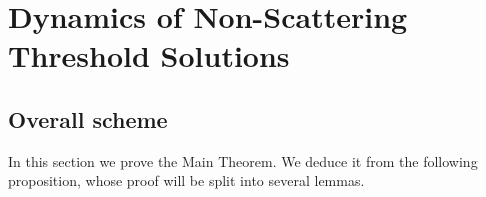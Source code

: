 \documentclass[10pt,reqno]{amsart}
\newcommand{\vd}{\mathrm{d}}
\newcommand{\udr}{\,r\vd r}
\newcommand{\A}{\mathcal{A}}
\newcommand{\la}{\lambda}
\newcommand{\La}{\Lambda}
\newcommand{\ang}[1]{\left\langle{#1}\right\rangle}
\newcommand{\abs}[1]{\left\lvert{#1}\right\rvert}
\numberwithin{equation}{section}
\theoremstyle{remark}
\newcommand{\ula}{\underline{\lambda}}
\newcommand{\ud}{\mathrm{d}}
\newcommand{\0}{\emptyset}
\begin{document}


  
\section{Dynamics of Non-Scattering Threshold Solutions} \label{s:dynamics}
\subsection{Overall scheme}
In this section we prove the Main Theorem.
We deduce it from the following proposition, whose proof will be split into several lemmas. 
\end{document}
